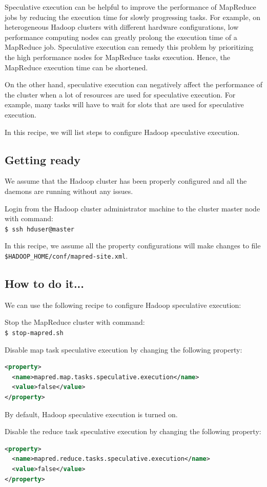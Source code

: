 Speculative execution can be helpful to improve the performance of MapReduce jobs by reducing the execution time for slowly progressing tasks.  For example, on heterogeneous Hadoop clusters with different hardware configurations, low performance computing nodes can greatly prolong the execution time of a MapReduce job. Speculative execution can remedy this problem by prioritizing the high performance nodes for MapReduce tasks execution. Hence, the MapReduce execution time can be shortened.

On the other hand, speculative execution can negatively affect the performance of the cluster when a lot of resources are used for speculative execution. For example, many tasks will have to wait for slots that are used for speculative execution.

In this recipe, we will list steps to configure Hadoop speculative execution.

\subsection*{Getting ready}
We assume that the Hadoop cluster has been properly configured and all the daemons are running without any issues.

Login from the Hadoop cluster administrator machine to the cluster master node with command: \\
\verb|$ ssh hduser@master|

In this recipe, we assume all the property configurations will make changes to file \verb|$HADOOP_HOME/conf/mapred-site.xml|.
\subsection*{How to do it...}
We can use the following recipe to configure Hadoop speculative execution:

Stop the MapReduce cluster with command: \\
\verb|$ stop-mapred.sh|

Disable map task speculative execution by changing the following property:
\lstset{style=bashstyle}
\begin{lstlisting}[language=XML]
<property>
  <name>mapred.map.tasks.speculative.execution</name>
  <value>false</value>
</property>
\end{lstlisting}
By default, Hadoop speculative execution is turned on.


Disable the reduce task speculative execution by changing the following property:
\lstset{style=bashstyle}
\begin{lstlisting}[language=XML]
<property>
  <name>mapred.reduce.tasks.speculative.execution</name>
  <value>false</value>
</property>
\end{lstlisting}


